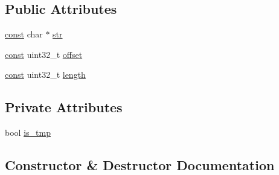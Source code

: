 \subsection*{Public Attributes}
\begin{DoxyCompactItemize}
\item 
\mbox{\hyperlink{ZlibCrc32_8h_a2c212835823e3c54a8ab6d95c652660e}{const}} char $\ast$ \mbox{\hyperlink{classlucene_1_1core_1_1analysis_1_1characterutil_1_1CharPtrRangeInfo_a353ede88ef69e0a7c11523fd7d419ef6}{str}}
\item 
\mbox{\hyperlink{ZlibCrc32_8h_a2c212835823e3c54a8ab6d95c652660e}{const}} uint32\+\_\+t \mbox{\hyperlink{classlucene_1_1core_1_1analysis_1_1characterutil_1_1CharPtrRangeInfo_a9ac49265cf8865e7a935631243c7e9bd}{offset}}
\item 
\mbox{\hyperlink{ZlibCrc32_8h_a2c212835823e3c54a8ab6d95c652660e}{const}} uint32\+\_\+t \mbox{\hyperlink{classlucene_1_1core_1_1analysis_1_1characterutil_1_1CharPtrRangeInfo_a816e4469bb018338dacaf8444c279688}{length}}
\end{DoxyCompactItemize}
\subsection*{Private Attributes}
\begin{DoxyCompactItemize}
\item 
bool \mbox{\hyperlink{classlucene_1_1core_1_1analysis_1_1characterutil_1_1CharPtrRangeInfo_ab54d53df8367d85ed226d19c187d6e28}{is\+\_\+tmp}}
\end{DoxyCompactItemize}


\subsection{Constructor \& Destructor Documentation}
\mbox{\label{classlucene_1_1core_1_1analysis_1_1characterutil_1_1CharPtrRangeInfo_a226d1ddc2c1996f0cd4fc6f2127f8196}} 
